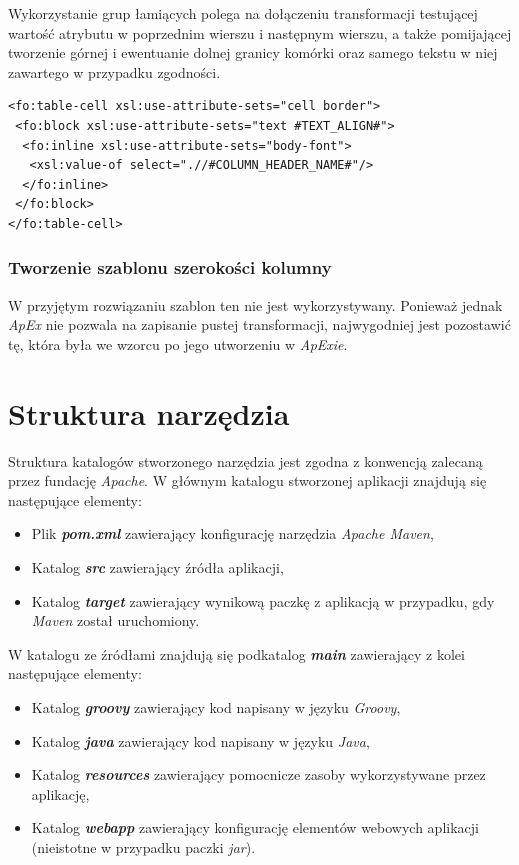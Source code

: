 \documentclass[11pt,a4paper]{article}
\begin{document}
Wykorzystanie grup łamiących polega na dołączeniu transformacji testującej wartość atrybutu w poprzednim wierszu i następnym wierszu, a także pomijającej tworzenie górnej i ewentuanie dolnej granicy komórki oraz samego tekstu w niej zawartego w przypadku zgodności.

\lstset{language=XSLT}
\begin{lstlisting}[frame=single,caption=Transformacja dla komórki tabeli, label=cell:xslt]
<fo:table-cell xsl:use-attribute-sets="cell border">
 <fo:block xsl:use-attribute-sets="text #TEXT_ALIGN#">
  <fo:inline xsl:use-attribute-sets="body-font">
   <xsl:value-of select=".//#COLUMN_HEADER_NAME#"/>
  </fo:inline>
 </fo:block>
</fo:table-cell>

\end{lstlisting}


\subsubsection{Tworzenie szablonu szerokości kolumny}
W przyjętym rozwiązaniu szablon ten nie jest wykorzystywany. Ponieważ jednak \emph{ApEx} nie pozwala na zapisanie pustej transformacji, najwygodniej jest pozostawić tę, która była we wzorcu po jego utworzeniu w \emph{ApExie}.
\newpage

\section{Struktura narzędzia}\label{solution:structure}
Struktura katalogów stworzonego narzędzia jest zgodna z konwencją zalecaną przez fundację \emph{Apache}. W głównym katalogu stworzonej aplikacji znajdują się następujące elementy:
\begin{itemize}
	\item Plik \emph{\textbf{pom.xml}} zawierający konfigurację narzędzia \emph{Apache Maven},
	\item Katalog \emph{\textbf{src}} zawierający źródła aplikacji,
	\item Katalog \emph{\textbf{target}} zawierający wynikową paczkę z aplikacją w przypadku, gdy \emph{Maven} został uruchomiony. 
\end{itemize}


W katalogu ze źródłami znajdują się podkatalog \emph{\textbf{main}} zawierający z kolei następujące elementy:
\begin{itemize}
	\item Katalog \emph{\textbf{groovy}} zawierający kod napisany w języku \emph{Groovy},
	\item Katalog \emph{\textbf{java}} zawierający kod napisany w języku \emph{Java},
	\item Katalog \emph{\textbf{resources}} zawierający pomocnicze zasoby wykorzystywane przez aplikację,
	\item Katalog \emph{\textbf{webapp}} zawierający konfigurację elementów webowych aplikacji (nieistotne w przypadku paczki \emph{jar}).
\end{itemize}
\end{document}
